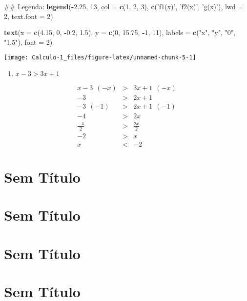 \documentclass[]{book}
\newenvironment{Shaded}{\begin{snugshade}}{\end{snugshade}}
\newcommand{\KeywordTok}[1]{\textcolor[rgb]{0.13,0.29,0.53}{\textbf{#1}}}
\newcommand{\DataTypeTok}[1]{\textcolor[rgb]{0.13,0.29,0.53}{#1}}
\newcommand{\DecValTok}[1]{\textcolor[rgb]{0.00,0.00,0.81}{#1}}
\newcommand{\FloatTok}[1]{\textcolor[rgb]{0.00,0.00,0.81}{#1}}
\newcommand{\StringTok}[1]{\textcolor[rgb]{0.31,0.60,0.02}{#1}}
\newcommand{\OperatorTok}[1]{\textcolor[rgb]{0.81,0.36,0.00}{\textbf{#1}}}
\newcommand{\NormalTok}[1]{#1}
\providecommand{\tightlist}{%
  \setlength{\itemsep}{0pt}\setlength{\parskip}{0pt}}
\begin{document}
\begin{enumerate}
\begin{Shaded}
\begin{Highlighting}[]
\NormalTok{##  Legenda:}
\KeywordTok{legend}\NormalTok{(}\OperatorTok{-}\FloatTok{2.25}\NormalTok{, }\DecValTok{13}\NormalTok{, }\DataTypeTok{col =} \KeywordTok{c}\NormalTok{(}\DecValTok{1}\NormalTok{, }\DecValTok{2}\NormalTok{, }\DecValTok{3}\NormalTok{), }\KeywordTok{c}\NormalTok{(}\StringTok{'f1(x)'}\NormalTok{, }\StringTok{'f2(x)'}\NormalTok{, }\StringTok{'g(x)'}\NormalTok{),}
   \DataTypeTok{lwd =} \DecValTok{2}\NormalTok{, }\DataTypeTok{text.font =} \DecValTok{2}\NormalTok{)}

\KeywordTok{text}\NormalTok{(}\DataTypeTok{x =} \KeywordTok{c}\NormalTok{(}\FloatTok{4.15}\NormalTok{, }\DecValTok{0}\NormalTok{, }\OperatorTok{-}\FloatTok{0.2}\NormalTok{, }\FloatTok{1.5}\NormalTok{), }\DataTypeTok{y =} \KeywordTok{c}\NormalTok{(}\DecValTok{0}\NormalTok{, }\FloatTok{15.75}\NormalTok{, }\OperatorTok{-}\DecValTok{1}\NormalTok{, }\DecValTok{11}\NormalTok{),}
 \DataTypeTok{labels =} \KeywordTok{c}\NormalTok{(}\StringTok{"x"}\NormalTok{, }\StringTok{"y"}\NormalTok{, }\StringTok{"0"}\NormalTok{, }\StringTok{"1.5"}\NormalTok{), }\DataTypeTok{font =} \DecValTok{2}\NormalTok{)}
\end{Highlighting}
\end{Shaded}

  \begin{center}\texttt{[image: Calculo-1\_files/figure-latex/unnamed-chunk-5-1]} \end{center}

  \begin{enumerate}
  \def\labelenumii{\alph{enumii})}
  \setcounter{enumii}{1}
  \tightlist
  \item
    \(x-3 > 3x+1\)
  \end{enumerate}

  \begin{eqnarray}
  x-3 \ \ (-x) &>& 3x+1 \ \ (-x) \nonumber \\
  -3 &>& 2x+1 \nonumber \\
  -3 \ \ (-1) &>& 2x+1 \ \ (-1) \nonumber \\
  -4 &>& 2x \nonumber \\
  \frac{-4}{2} &>& \frac{2x}{2} \nonumber \\
  -2 &>& x  \nonumber \\
  x &<& -2 \nonumber
  \end{eqnarray}
\end{enumerate}

\chapter{Sem Título}\label{sem-titulo}

\chapter{Sem Título}\label{sem-titulo-1}

\chapter{Sem Título}\label{sem-titulo-2}

\chapter{Sem Título}\label{sem-titulo-3}


\end{document}
